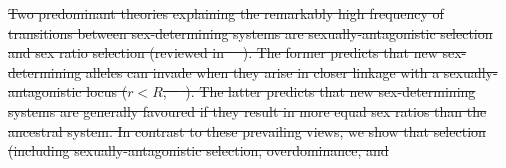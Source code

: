 \documentclass[10pt,letterpaper]{article}
\providecommand{\DIFadd}[1]{{\protect\color{blue}\uwave{#1}}} %
\providecommand{\DIFdel}[1]{{\protect\color{red}\sout{#1}}}                      %
\providecommand{\DIFaddbegin}{} %
\providecommand{\DIFdelbegin}{} %
\providecommand{\DIFdelend}{} %
\begin{document}

\DIFdelbegin \DIFdel{Two predominant theories explaining the remarkably high frequency of transitions between sex-determining systems are sexually-antagonistic selection and sex ratio selection (reviewed in~\mbox{%
\cite{Blaser2012, vanDoorn2014re}}%
).
The former predicts that new sex-determining alleles can invade when they arise in closer linkage with a sexually-antagonistic locus ($r<R$,~\mbox{%
\cite{vanDoorn:2007eu,vanDoorn:2010hu, Muralidhar2018}}%
).
The latter predicts that new sex-determining systems are generally favoured if they result in more equal sex ratios than the ancestral system.
In contrast to these prevailing views, we show that selection (including sexually-antagonistic selection, overdominance, and}\DIFdelend \DIFaddbegin \section*{\DIFadd{Discussion}}
\end{document}
